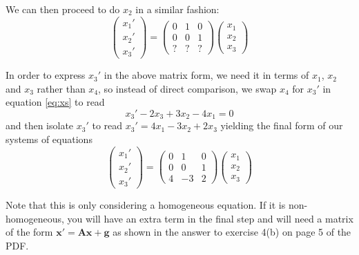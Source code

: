 We can then proceed to do $x_2$ in a similar fashion:
\begin{equation}
    \left(
        \begin{array}{c}
            x_1' \\
            x_2' \\
            x_3'
        \end{array}
    \right)
    =
    \left(
        \begin{array}{ccc}
            0 & 1 & 0 \\
            0 & 0 & 1 \\
            ? & ? & ?
        \end{array}
    \right)
    \left(
        \begin{array}{c}
            x_1 \\
            x_2 \\
            x_3
        \end{array}
    \right)
\end{equation}

In order to express $x_3'$ in the above matrix form, we need it in terms of $x_1$, $x_2$ and $x_3$ rather than $x_4$, so instead of direct comparison, we swap $x_4$ for $x_3'$ in equation \ref{eq:xs} to read
\begin{equation}
    x_3' - 2 x_3 + 3 x_2 - 4 x_1 = 0
\end{equation}
and then isolate $x_3'$ to read $x_3' = 4 x_1 - 3 x_2 + 2 x_3$ yielding the final form of our systems of equations
\begin{equation}
    \left(
        \begin{array}{c}
            x_1' \\
            x_2' \\
            x_3'
        \end{array}
    \right)
    =
    \left(
        \begin{array}{ccc}
            0 & 1 & 0 \\
            0 & 0 & 1 \\
            4 & -3 & 2
        \end{array}
    \right)
    \left(
        \begin{array}{c}
            x_1 \\
            x_2 \\
            x_3
        \end{array}
    \right)
\end{equation}

Note that this is only considering a homogeneous equation. If it is non-homogeneous, you will have an extra term in the final step and will need a matrix of the form  $\bm{x'} = \bm{A}\bm{x} + \bm{g}$ as shown in the answer to exercise 4(b) on page 5 of the PDF.

